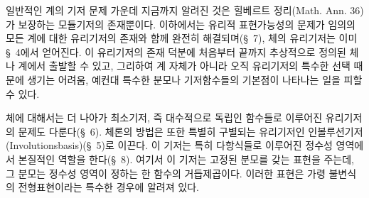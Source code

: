 
일반적인 계의 기저 문제 가운데 지금까지 알려진 것은 힐베르트 정리(Math. Ann. 36)가 보장하는 모듈기저의 존재뿐이다. 이하에서는 유리적 표현가능성의 문제가 임의의 모든 계에 대한 유리기저의 존재와 함께 완전히 해결되며(\S\ 7), 체의 유리기저는 이미 \S\ 4에서 얻어진다. 이 유리기저의 존재 덕분에 처음부터 끝까지 추상적으로 정의된 체나 계에서 출발할 수 있고, 그리하여 계 자체가 아니라 오직 유리기저의 특수한 선택 때문에 생기는 어려움, 예컨대 특수한 분모나 기저함수들의 기본점이 나타나는 일을 피할 수 있다.

체에 대해서는 더 나아가 최소기저, 즉 대수적으로 독립인 함수들로 이루어진 유리기저의 문제도 다룬다(\S\ 6). 체론의 방법은 또한 특별히 구별되는 유리기저인 인볼루션기저(Involutionsbasis)(\S\ 5)로 이끈다. 이 기저는 특히 다항식들로 이루어진 정수성 영역에서 본질적인 역할을 한다(\S\ 8). 여기서 이 기저는 고정된 분모를 갖는 표현을 주는데, 그 분모는 정수성 영역이 정하는 한 함수의 거듭제곱이다. 이러한 표현은 가령 불변식의 전형표현이라는 특수한 경우에 알려져 있다.
